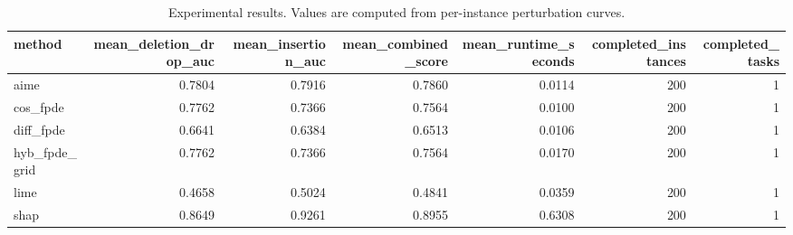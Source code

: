 \begin{table}[t]
\caption{Experimental results. Values are computed from per-instance perturbation curves.}
\label{tab:main_results_computed}
\centering
\begin{tabular}{lrrrrrr}
\toprule
method & mean\_deletion\_drop\_auc & mean\_insertion\_auc & mean\_combined\_score & mean\_runtime\_seconds & completed\_instances & completed\_tasks \\
\midrule
aime & 0.7804 & 0.7916 & 0.7860 & 0.0114 & 200 & 1 \\
cos\_fpde & 0.7762 & 0.7366 & 0.7564 & 0.0100 & 200 & 1 \\
diff\_fpde & 0.6641 & 0.6384 & 0.6513 & 0.0106 & 200 & 1 \\
hyb\_fpde\_grid & 0.7762 & 0.7366 & 0.7564 & 0.0170 & 200 & 1 \\
lime & 0.4658 & 0.5024 & 0.4841 & 0.0359 & 200 & 1 \\
shap & 0.8649 & 0.9261 & 0.8955 & 0.6308 & 200 & 1 \\
\bottomrule
\end{tabular}

\end{table}
